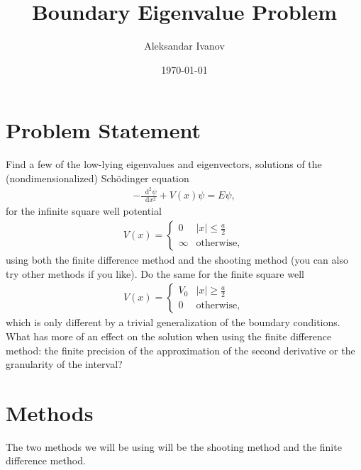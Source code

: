 \documentclass[10pt,a4paper,twocolumn]{article}
\newcommand{\diff}{\mathop{}\!\mathrm{d}}
\begin{document}
\title{Boundary Eigenvalue Problem}
\author{Aleksandar Ivanov}
\date{\today}
\maketitle

\section{Problem Statement}

Find a few of the low-lying eigenvalues and eigenvectors, solutions of the (nondimensionalized) Schödinger equation
%
\begin{align}\label{eq:schroe}
    - \frac{\diff^2 \psi}{\diff x^2} + V(x) \psi = E \psi,
\end{align}
%
for the infinite square well potential
%
\begin{align}
    V(x) = \begin{cases}
        0 & |x| \leq \frac{a}{2} \\
        \infty & \mathrm{otherwise},
    \end{cases}
\end{align}
%
using both the finite difference method and the shooting method (you can also try other methods if you like). Do the same for the finite square well
%
\begin{align}
    V(x) = \begin{cases}
        V_0 & |x| \geq \frac{a}{2} \\
        0 & \mathrm{otherwise},
    \end{cases}
\end{align}
%
which is only different by a trivial generalization of the boundary conditions. What has more of an effect on the solution when using the finite difference method: the finite precision of the approximation of the second derivative or the granularity of the interval?

\section{Methods}

The two methods we will be using will be the shooting method and the finite difference method.
\end{document}
